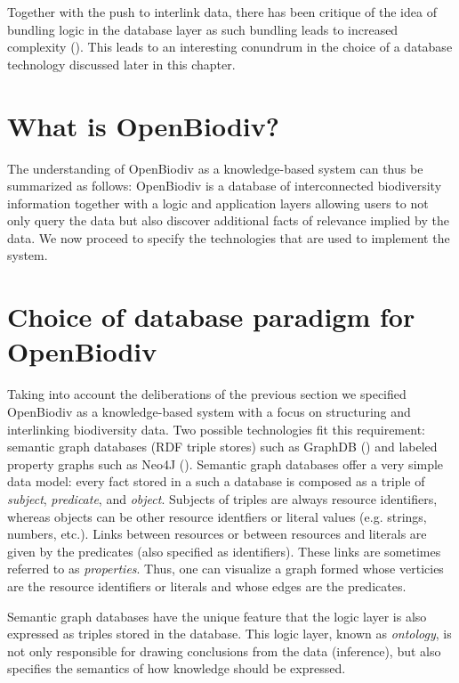 Together with the push to interlink data, there has been critique of the idea of bundling logic in the database layer as such bundling leads to increased complexity (\cite{barrasa_rdf_2017}). This leads to an interesting conundrum in the choice of a database technology discussed later in this chapter.

\section{What is OpenBiodiv?}

The understanding of OpenBiodiv as a knowledge-based system can thus be summarized as follows: OpenBiodiv is a  database of interconnected biodiversity information together with a logic and application layers allowing users to not only query the data but also discover additional facts of relevance implied by the data. We now proceed to specify the technologies that are used to implement the system.

\section{Choice of database paradigm for OpenBiodiv}

Taking into account the deliberations of the previous section we specified OpenBiodiv as a knowledge-based system with a focus on structuring and interlinking biodiversity data. Two possible technologies fit this requirement: semantic graph databases (RDF triple stores) such as GraphDB (\cite{ontotext_graphdb_2018}) and labeled property graphs such as Neo4J (\cite{neo4j_developers_neo4j_2012}).  Semantic graph databases offer a very simple data model: every fact stored in a such a database is composed as a triple of \emph{subject}, \emph{predicate}, and \emph{object}.  Subjects of triples are always resource identifiers, whereas objects can be other resource identfiers or literal values (e.g. strings, numbers, etc.).  Links between resources or between resources and literals are given by the predicates (also specified as identifiers). These links are sometimes referred to as \emph{properties}. Thus, one can visualize a graph formed whose verticies are the resource identifiers or literals and whose edges are the predicates.

Semantic graph databases have the unique feature that the logic layer is also expressed as triples stored in the database. This logic layer, known as \emph{ontology}, is not only responsible for drawing conclusions from the data (inference), but also specifies the semantics of how knowledge should be expressed.

